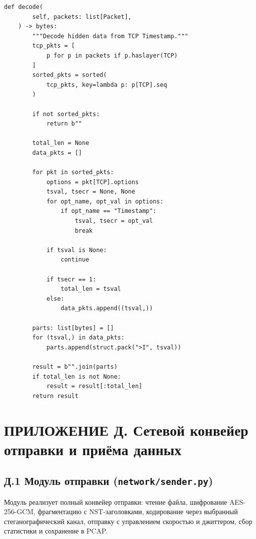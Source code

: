 \begin{lstlisting}[style=appendixcode]
    def decode(
        self, packets: list[Packet],
    ) -> bytes:
        """Decode hidden data from TCP Timestamp."""
        tcp_pkts = [
            p for p in packets if p.haslayer(TCP)
        ]
        sorted_pkts = sorted(
            tcp_pkts, key=lambda p: p[TCP].seq
        )

        if not sorted_pkts:
            return b""

        total_len = None
        data_pkts = []

        for pkt in sorted_pkts:
            options = pkt[TCP].options
            tsval, tsecr = None, None
            for opt_name, opt_val in options:
                if opt_name == "Timestamp":
                    tsval, tsecr = opt_val
                    break

            if tsval is None:
                continue

            if tsecr == 1:
                total_len = tsval
            else:
                data_pkts.append((tsval,))

        parts: list[bytes] = []
        for (tsval,) in data_pkts:
            parts.append(struct.pack(">I", tsval))

        result = b"".join(parts)
        if total_len is not None:
            result = result[:total_len]
        return result
\end{lstlisting}

\newpage
\section*{ПРИЛОЖЕНИЕ Д. Сетевой конвейер отправки и приёма данных}

\subsection*{Д.1 Модуль отправки (\texttt{network/sender.py})}

Модуль реализует полный конвейер отправки: чтение файла, шифрование
AES-256-GCM, фрагментацию с NST-заголовками, кодирование через
выбранный стеганографический канал, отправку с управлением
скоростью и джиттером, сбор статистики и сохранение в PCAP.

